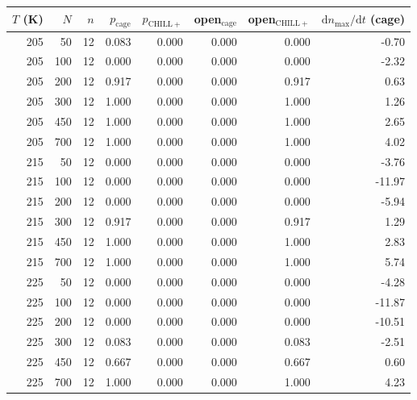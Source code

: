 \begin{tabular}{rrrrrrrr}
\hline
$T$ (K) & $N$ & $n$ & $p_{\mathrm{cage}}$ & $p_{\mathrm{CHILL+}}$ & open$_{\mathrm{cage}}$ & open$_{\mathrm{CHILL+}}$ & $\mathrm{d}n_{\max}/\mathrm{d}t$ (cage) \\
\hline
205 & 50 & 12 & 0.083 & 0.000 & 0.000 & 0.000 & -0.70 \\
205 & 100 & 12 & 0.000 & 0.000 & 0.000 & 0.000 & -2.32 \\
205 & 200 & 12 & 0.917 & 0.000 & 0.000 & 0.917 & 0.63 \\
205 & 300 & 12 & 1.000 & 0.000 & 0.000 & 1.000 & 1.26 \\
205 & 450 & 12 & 1.000 & 0.000 & 0.000 & 1.000 & 2.65 \\
205 & 700 & 12 & 1.000 & 0.000 & 0.000 & 1.000 & 4.02 \\
215 & 50 & 12 & 0.000 & 0.000 & 0.000 & 0.000 & -3.76 \\
215 & 100 & 12 & 0.000 & 0.000 & 0.000 & 0.000 & -11.97 \\
215 & 200 & 12 & 0.000 & 0.000 & 0.000 & 0.000 & -5.94 \\
215 & 300 & 12 & 0.917 & 0.000 & 0.000 & 0.917 & 1.29 \\
215 & 450 & 12 & 1.000 & 0.000 & 0.000 & 1.000 & 2.83 \\
215 & 700 & 12 & 1.000 & 0.000 & 0.000 & 1.000 & 5.74 \\
225 & 50 & 12 & 0.000 & 0.000 & 0.000 & 0.000 & -4.28 \\
225 & 100 & 12 & 0.000 & 0.000 & 0.000 & 0.000 & -11.87 \\
225 & 200 & 12 & 0.000 & 0.000 & 0.000 & 0.000 & -10.51 \\
225 & 300 & 12 & 0.083 & 0.000 & 0.000 & 0.083 & -2.51 \\
225 & 450 & 12 & 0.667 & 0.000 & 0.000 & 0.667 & 0.60 \\
225 & 700 & 12 & 1.000 & 0.000 & 0.000 & 1.000 & 4.23 \\
\hline
\end{tabular}

